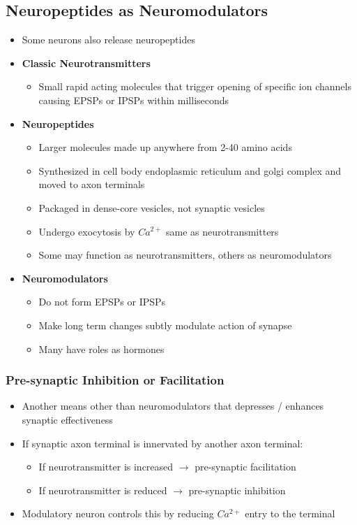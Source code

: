 \documentclass[11pt]{article}
\begin{document}
\subsection{Neuropeptides as Neuromodulators}
\begin{itemize}
\item Some neurons also release neuropeptides 
\item \textbf{Classic Neurotransmitters}
\begin{itemize}
\item Small rapid acting molecules that trigger opening of specific ion channels causing EPSPs or IPSPs within milliseconds
\end{itemize}
\item \textbf{Neuropeptides}
\begin{itemize}
\item Larger molecules made up anywhere from  2-40 amino acids
\item Synthesized in cell body endoplasmic reticulum and golgi complex and moved to axon terminals
\item Packaged in dense-core vesicles, not synaptic vesicles
\item Undergo exocytosis by $Ca^{2+}$ same as neurotransmitters
\item Some may function as neurotransmitters, others as neuromodulators
\end{itemize}
\item \textbf{Neuromodulators}
\begin{itemize}
\item Do not form EPSPs or IPSPs
\item Make long term changes subtly modulate action of synapse
\item Many have roles as hormones
\end{itemize}
\end{itemize}

\subsubsection{Pre-synaptic Inhibition or Facilitation}
\begin{itemize}
\item Another means other than neuromodulators that depresses / enhances synaptic effectiveness
\item If synaptic axon terminal is innervated by another axon terminal:
\begin{itemize}
\item If neurotransmitter is increased $\rightarrow$ pre-synaptic facilitation
\item If neurotransmitter is reduced $\rightarrow$ pre-synaptic inhibition
\end{itemize}
\item Modulatory neuron controls this by reducing $Ca^{2+}$ entry to the terminal
\end{itemize}
\end{document}
